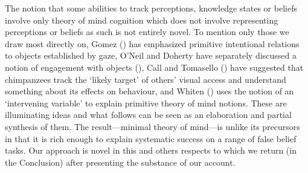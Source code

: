 \documentclass[12pt,\papersize]{extarticle}
\begin{document}
The notion that some abilities to track perceptions, knowledge states or beliefs involve only theory of mind cognition which does not involve representing perceptions or beliefs as such is not entirely novel.
To mention only those we draw most directly on, Gomez (\citeyear[][p.\ 730]{en_1259}) has emphasized primitive intentional relations to objects established by gaze, O’Neil and Doherty have separately discussed a notion of engagement with objects (\citealp{en_1159, en_1140}), Call and Tomasello (\citeyear[][p.\ 58]{en_1669}) have suggested that chimpanzees track the `likely target' of others’ visual access and understand something about its effects on behaviour, and Whiten (\citeyear[]{en_1415, en_1416}) uses the notion of an `intervening variable' to explain primitive theory of mind notions.  These are illuminating ideas and what follows can be seen as an elaboration and partial synthesis of them.  
The result---minimal theory of mind---is unlike its precursors in that it is rich enough to explain systematic success on a range of false belief tasks.  Our approach is novel in this and others respects to which we return (in the Conclusion) after presenting the substance of our account.



%
%
\end{document}
